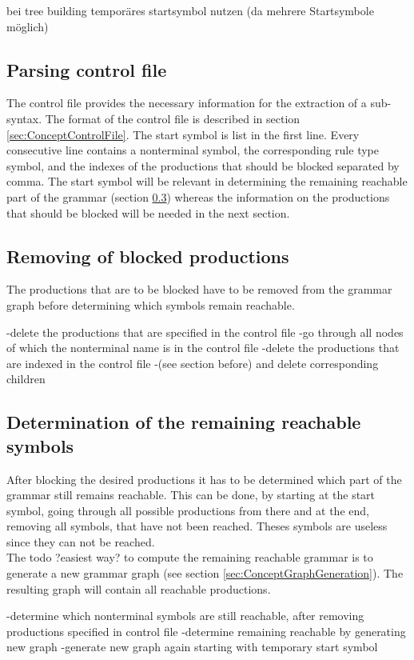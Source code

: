bei tree building temporäres startsymbol nutzen (da mehrere Startsymbole möglich)
\subsection{Parsing control file}\label{sec:ConceptParsingControlFile}
The control file provides the necessary information for the extraction of a sub-syntax.
The format of the control file is described in section \ref{sec:ConceptControlFile}.
The start symbol is list in the first line.
Every consecutive line contains a nonterminal symbol, the corresponding rule type symbol, and the indexes of the productions that should be blocked separated by comma.
The start symbol will be relevant in determining the remaining reachable part of the grammar (section \ref{sec:ConceptDerterminingRemainingReachable}) whereas the information on the productions that should be blocked will be needed in the next section.
\subsection{Removing of blocked productions}\label{sec:ConceptRemovingBlockedProductions}
The productions that are to be blocked have to be removed from the grammar graph before determining which symbols remain reachable.

-delete the productions that are specified in the control file
-go through all nodes of which the nonterminal name is in the control file
-delete the productions that are indexed in the control file
-(see section before) and delete corresponding children
\subsection{Determination of the remaining reachable symbols}\label{sec:ConceptDerterminingRemainingReachable}
After blocking the desired productions it has to be determined which part of the grammar still remains reachable.
This can be done, by starting at the start symbol, going through all possible productions from there and at the end, removing all symbols, that have not been reached.
Theses symbols are useless since they can not be reached.\\
The todo ?easiest way? to compute the remaining reachable grammar is to generate a new grammar graph (see section \ref{sec:ConceptGraphGeneration}). The resulting graph will contain all reachable productions.

-determine which nonterminal symbols are still reachable, after removing productions specified in control file
-determine remaining reachable by generating new graph
-generate new graph again starting with temporary start symbol

